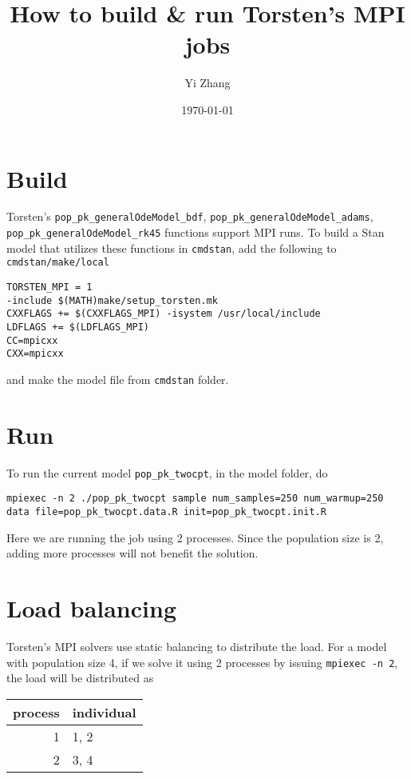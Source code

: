 \documentclass[11pt]{article}
\author{Yi Zhang}
\date{\today}
\title{How to build \& run Torsten's MPI jobs}
\begin{document}
\maketitle

\section{Build}
\label{sec:orgca90792}
Torsten's \texttt{pop\_pk\_generalOdeModel\_bdf}, \texttt{pop\_pk\_generalOdeModel\_adams},
\texttt{pop\_pk\_generalOdeModel\_rk45} functions support MPI
runs. To build a Stan model that utilizes these functions in \texttt{cmdstan},
add the following to \texttt{cmdstan/make/local}
\begin{verbatim}
TORSTEN_MPI = 1
-include $(MATH)make/setup_torsten.mk
CXXFLAGS += $(CXXFLAGS_MPI) -isystem /usr/local/include
LDFLAGS += $(LDFLAGS_MPI)
CC=mpicxx
CXX=mpicxx
\end{verbatim}

and make the model file from \texttt{cmdstan} folder.

\section{Run}
\label{sec:orgeaa48b0}
To run the current model \texttt{pop\_pk\_twocpt}, in the model
folder, do
\begin{verbatim}
mpiexec -n 2 ./pop_pk_twocpt sample num_samples=250 num_warmup=250 data file=pop_pk_twocpt.data.R init=pop_pk_twocpt.init.R
\end{verbatim}

Here we are running the job using 2 processes. Since the
population size is 2, adding more processes will not benefit
the solution.

\section{Load balancing}
\label{sec:org2f92a7c}
Torsten's MPI solvers use static balancing to
distribute the load. For a model with population size 4, 
if we solve it using
2 processes by issuing \texttt{mpiexec -n 2},
the load will be
distributed as
\begin{center}
\begin{tabular}{rl}
process & individual\\
\hline
1 & 1, 2\\
2 & 3, 4\\
\end{tabular}
\end{center}
\end{document}
